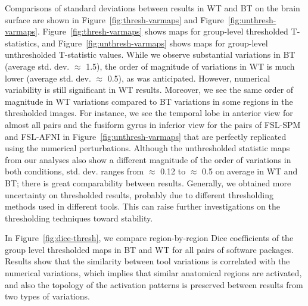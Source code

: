 \documentclass[runningheads]{llncs}
\begin{document}
Comparisons of standard deviations between results in WT and BT
on the brain surface are shown in Figure~\ref{fig:thresh-varmaps} and Figure~\ref{fig:unthresh-varmaps}.
Figure~\ref{fig:thresh-varmaps} shows maps for group-level thresholded T-statistics, and
Figure~\ref{fig:unthresh-varmaps} shows maps for group-level unthresholded T-statistic values.
While we observe substantial variations in BT (average std. dev. $\approx$ 1.5),
the order of magnitude of variations in WT is much lower (average std. dev. $\approx$ 0.5),
as was anticipated. However, numerical variability is still significant in WT results.
Moreover, we see the same order of magnitude in WT variations compared to BT variations
in some regions in the thresholded images.
For instance, we see the temporal lobe in anterior view for almost all pairs and the fusiform gyrus in inferior view
for the pairs of FSL-SPM and FSL-AFNI in Figure~\ref{fig:unthresh-varmaps}
that are perfectly replicated using the numerical perturbations. 
Although the unthresholded statistic maps from our analyses also show a different magnitude of
the order of variations in both conditions, std. dev. ranges from $\approx$ 0.12 to $\approx$ 0.5 on average in WT and BT;
there is great comparability between results.
Generally, we obtained more uncertainty on thresholded results, probably due to different thresholding
methods used in different tools.
This can raise further investigations on the thresholding techniques toward stability.

In Figure~\ref{fig:dice-thresh}, we compare region-by-region Dice coefficients of
the group level thresholded maps in BT and WT for all pairs of software packages.
Results show that the similarity between tool variations is correlated with the numerical variations,
which implies that similar anatomical regions are activated, and also the topology of the activation patterns
is preserved between results from two types of variations.

\end{document}
